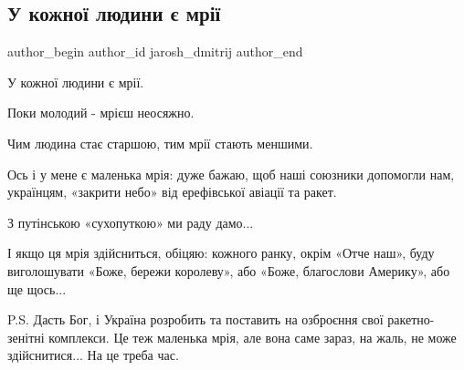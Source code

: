  
 
 
 
 
 
\subsection{У кожної людини є мрії}
\label{sec:21_01_2022.fb.jarosh_dmitrij.1.mechty}
 
\ifcmt
 author_begin
   author_id jarosh_dmitrij
 author_end
\fi

У кожної людини є мрії.

Поки молодий - мрієш неосяжно.

Чим людина стає старшою, тим мрії стають меншими.

Ось і у мене є маленька мрія: дуже бажаю, щоб наші союзники допомогли нам,
українцям, «закрити небо» від ерефівської авіації та ракет.

З путінською «сухопуткою» ми раду дамо...

І якщо ця мрія здійсниться, обіцяю: кожного ранку, окрім «Отче наш», буду
виголошувати «Боже, бережи королеву», або «Боже, благослови Америку», або ще
щось...

P.S. Дасть Бог, і Україна розробить та поставить на озброєння свої
ракетно-зенітні комплекси. Це теж маленька мрія, але вона саме зараз, на жаль,
не може здійснитися... На це треба час.
